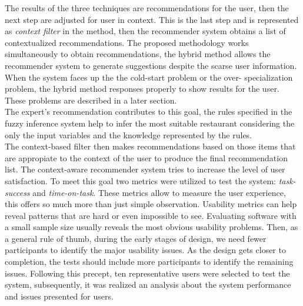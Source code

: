 The results of the three techniques are recommendations for the user,
then the next step are adjusted  for user in context. This is the last
step and is represented as \textit{context filter} in the method, then
the recommender system obtains a list of contextualized
recommendations. The proposed methodology works simultaneously to
obtain recommendations, the hybrid method allows the recommender
system to generate suggestions despite the scarse user information.
When the system faces up the the cold-start problem or the over-
specialization problem, the hybrid method responses properly to show
results for the user. These problems are described in a later
section. \\
The expert's recommendation contributes to this goal, the rules
specified in the fuzzy inference system help to infer the most
suitable restaurant considering the only the input variables and the
knowledge represented by the rules.\\ The context-based filter then
makes recommendations based on those items that are appropiate to the
context of the user to produce the final recommendation list.  The
context-aware recommender system tries to increase the level of user
satisfaction.
To meet this goal two metrics were utilized to test the system:
\textit{task-success} and \textit{time-on-task}. These metrics allow
to measure the user experience, this offers so much more than just
simple observation. Usability metrics can help reveal patterns that
are hard or even impossible to see. Evaluating software with a small
sample size usually reveals the most obvious usability
problems\cite{albert2013measuring}.
Then, as a general rule of thumb, during the early stages of design,
we need fewer participants to identify the major usability issues. As
the design gets closer to completion, the tests should include more
participants to identify the remaining issues. Following this precept,
ten representative users were selected to test the system,
subsequently, it was realized an analysis about the system performance
and issues presented for users.\\
%
%
